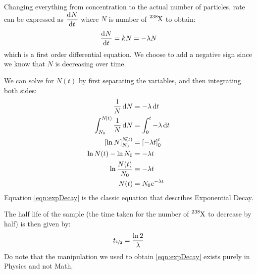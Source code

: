 \documentclass[answers]{exam}
\begin{document}
\begin{questions}
{\begin{solution}
			Changing everything from concentration to the actual number of particles, rate can be expressed as $\dod{N}{t}$ where $N$ is number of $\ce{^238X}$ to obtain:
			\begin{equation}
				\dod{N}{t} = kN = -\lambda N
			\end{equation}
			which is a first order differential equation. We choose to add a negative sign since we know that $N$ is decreasing over time. 

			We can solve for $N\!\left(t\right)$ by first separating the variables, and then integrating both sides:
			\begin{align}
				\frac{1}{N} \dif{N} &= -\lambda \dif{t} \notag \\
				\int_{N_0}^{N\!\left(t\right)} \frac{1}{N} \dif{N} &= \int_0^t -\lambda  \dif{t} \notag \\
				\left[\ln{N}\right]_{N_0}^{N\!\left(t\right)} &= \left[-\lambda t\right]_0^t \notag \\
				\ln{N\!\left(t\right)} - \ln{N_0} &= -\lambda t \notag \\
				\ln{\frac{N\!\left(t\right)}{N_0}} &= -\lambda t \notag \\
				N\!\left(t\right) &= N_0e^{-\lambda t} \label{eqn:expDecay}
			\end{align}
			Equation \eqref{eqn:expDecay} is the classic equation that describes Exponential Decay.

			The half life of the sample (the time taken for the number of $\ce{^238X}$ to decrease by half) is then given by:
			\begin{equation}
				t_{\nicefrac{1}{2}} = \frac{\ln 2}{\lambda}
			\end{equation}
			Do note that the manipulation we used to obtain \eqref{eqn:expDecay} exists purely in Physics and not Math.
		\end{solution}
	}

\end{questions}
\end{document}
